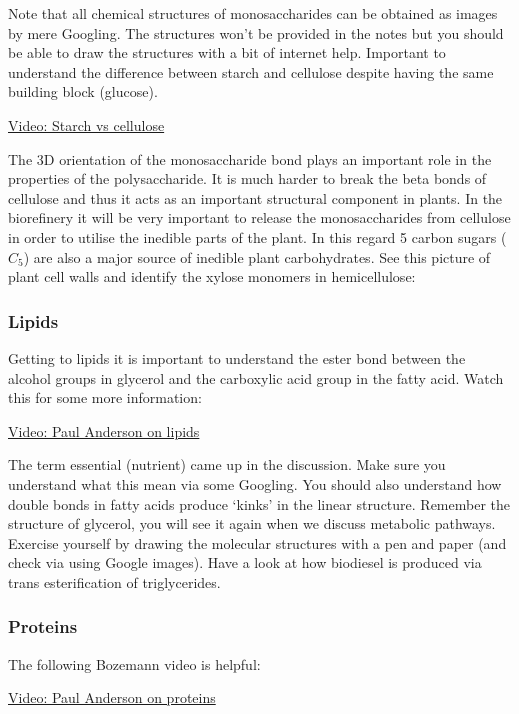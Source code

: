 \documentclass[11pt]{article}
\begin{document}
Note that all chemical structures of monosaccharides can be obtained as
images by mere Googling. The structures won't be provided in the notes
but you should be able to draw the structures with a bit of internet
help. Important to understand the difference between starch and
cellulose despite having the same building block (glucose).

\href{http://study.com/academy/lesson/starch-vs-cellulose-structure-function.html}{Video:
Starch vs cellulose}

The 3D orientation of the monosaccharide bond plays an important role in
the properties of the polysaccharide. It is much harder to break the
beta bonds of cellulose and thus it acts as an important structural
component in plants. In the biorefinery it will be very important to
release the monosaccharides from cellulose in order to utilise the
inedible parts of the plant. In this regard 5 carbon sugars (\(C_5\))
are also a major source of inedible plant carbohydrates. See this
picture of plant cell walls and identify the xylose monomers in
hemicellulose:

\subsubsection{Lipids}\label{lipids}

Getting to lipids it is important to understand the ester bond between
the alcohol groups in glycerol and the carboxylic acid group in the
fatty acid. Watch this for some more information:

\href{https://www.youtube.com/watch?v=VGHD9e3yRIU}{Video: Paul Anderson
on lipids}

The term essential (nutrient) came up in the discussion. Make sure you
understand what this mean via some Googling. You should also understand
how double bonds in fatty acids produce `kinks' in the linear structure.
Remember the structure of glycerol, you will see it again when we
discuss metabolic pathways. Exercise yourself by drawing the molecular
structures with a pen and paper (and check via using Google images).
Have a look at how biodiesel is produced via trans esterification of
triglycerides.

    \subsubsection{Proteins}\label{proteins}

The following Bozemann video is helpful:

\href{https://www.youtube.com/watch?v=2Jgb_DpaQhM}{Video: Paul Anderson
on proteins}
\end{document}
